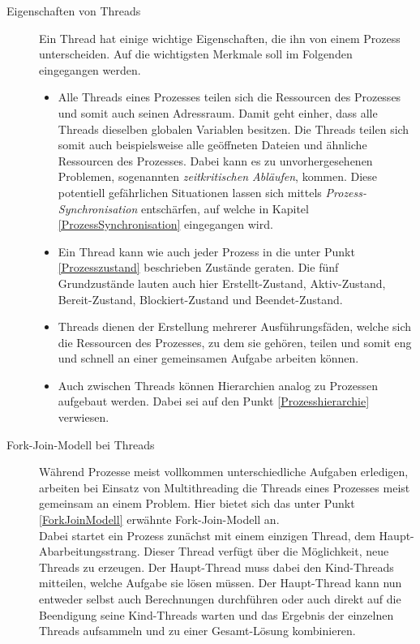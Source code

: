 				\begin{description}
					\item[Eigenschaften von Threads]
					
						Ein Thread hat einige wichtige Eigenschaften, die ihn von einem Prozess unterscheiden. Auf die wichtigsten Merkmale soll im Folgenden eingegangen werden.
						
						\begin{itemize}
							\item
								Alle Threads eines Prozesses teilen sich die Ressourcen des Prozesses und somit auch seinen Adressraum. Damit geht einher, dass alle Threads dieselben globalen Variablen besitzen. Die Threads teilen sich somit auch beispielsweise alle geöffneten Dateien und ähnliche Ressourcen des Prozesses. Dabei kann es zu unvorhergesehenen Problemen, sogenannten \textit{zeitkritischen Abläufen}, kommen. Diese potentiell gefährlichen Situationen lassen sich mittels \textit{Prozess-Synchronisation} entschärfen, auf welche in Kapitel \ref{ProzessSynchronisation} eingegangen wird.
							\item
								Ein Thread kann wie auch jeder Prozess in die unter Punkt \ref{Prozesszustand} beschrieben Zustände geraten. Die fünf Grundzustände lauten auch hier Erstellt-Zustand, Aktiv-Zustand, Bereit-Zustand, Blockiert-Zustand und Beendet-Zustand.
							\item
								Threads dienen der Erstellung mehrerer Ausführungsfäden, welche sich die Ressourcen des Prozesses, zu dem sie gehören, teilen und somit eng und schnell an einer gemeinsamen Aufgabe arbeiten können.
							\item
								Auch zwischen Threads können Hierarchien analog zu Prozessen aufgebaut werden. Dabei sei auf den Punkt \ref{Prozesshierarchie} verwiesen. \cite{ModerneBetriebssysteme}
						\end{itemize}
					
					\item[Fork-Join-Modell bei Threads]
						
						Während Prozesse meist vollkommen unterschiedliche Aufgaben erledigen, arbeiten bei Einsatz von Multithreading die Threads eines Prozesses meist gemeinsam an einem Problem. Hier bietet sich das unter Punkt \ref{ForkJoinModell} erwähnte Fork-Join-Modell an.\\
						Dabei startet ein Prozess zunächst mit einem einzigen Thread, dem Haupt-Abarbeitungsstrang. Dieser Thread verfügt über die Möglichkeit, neue Threads zu erzeugen. Der Haupt-Thread muss dabei den Kind-Threads mitteilen, welche Aufgabe sie lösen müssen. Der Haupt-Thread kann nun entweder selbst auch Berechnungen durchführen oder auch direkt auf die Beendigung seine Kind-Threads warten und das Ergebnis der einzelnen Threads aufsammeln und zu einer Gesamt-Lösung kombinieren. \cite{ModerneBetriebssysteme} \cite{ParaProgRauber}
					

\end{description}
